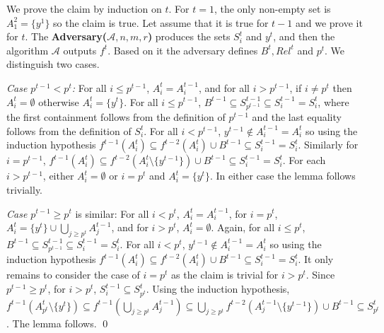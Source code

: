 \documentclass[runningheads,a4paper]{llncs}
\newcommand{\A}{\mathcal{A}}
\newenvironment{proofof}[1]{\noindent{\it Proof of #1. }} {{\qed}}
\begin{document}
\bigskip
\begin{proofof}{Lemma \ref{l-p2}}
We prove the claim by induction on $t$. For $t=1$, the only non-empty set is $A^2_1=\{y^1\}$ so the claim is true. 
Let assume that it is true for $t-1$ and we prove it for $t$. 
The {\bf Adversary($\A,n,m,r$)} produces the sets $S^t_i$ and $y^t$, and then the algorithm $\A$ outputs $f^t$.
Based on it the adversary defines $B^t, Rel^t$ and $p^t$.
We distinguish two cases.

\emph{Case $p^{t-1} < p^t$:} For all $i\le p^{t-1}$, $A^{t}_i = A^{t-1}_i$, and for all $i> p^{t-1}$, if $i\not=p^t$ then $A^t_i=\emptyset$
otherwise $A^t_i = \{y^t\}$. For all $i\le p^{t-1}$, $B^{t-1} \subseteq S^{t-1}_{p^{t-1}} \subseteq S^{t-1}_i = S^t_i$, where
the first containment follows from the definition of $p^{t-1}$ and the last equality follows from the definition of $S^t_i$.
For all $i<p^{t-1}$, $y^{t-1} \not\in A^{t-1}_i = A^t_i$ so using the induction hypothesis 
$f^{t-1}(A^t_i) \subseteq f^{t-2}(A^t_i) \cup B^{t-1} \subseteq S^{t-1}_i = S^t_i$.
Similarly for $i=p^{t-1}$, $f^{t-1}(A^t_i) \subseteq f^{t-2}(A^t_i \setminus \{y^{t-1}\}) \cup B^{t-1} \subseteq S^{t-1}_i = S^t_i$.
For each $i>p^{t-1}$, either $A^t_i = \emptyset$ or $i=p^t$ and $A^t_i=\{y^t\}$. In either case the lemma follows trivially.

\emph{Case $p^{t-1} \ge p^t$} is similar: For all $i < p^{t}$, $A^{t}_i = A^{t-1}_i$, for $i=p^t$, $A^t_i = \{y^t\} \cup \bigcup_{j\ge p^t} A^{t-1}_j$,
and for $i>p^t$, $A^t_i=\emptyset$. Again, for all $i\le p^{t}$, $B^{t-1} \subseteq S^{t-1}_{p^{t-1}} \subseteq S^{t-1}_i = S^t_i$.
For all $i<p^{t}$, $y^{t-1} \not\in A^{t-1}_i = A^t_i$ so using the induction hypothesis 
$f^{t-1}(A^t_i) \subseteq f^{t-2}(A^t_i) \cup B^{t-1} \subseteq S^{t-1}_i = S^t_i$.
It only remains to consider the case of $i=p^t$ as the claim is trivial for $i>p^t$.
Since $p^{t-1} \ge p^t$, for $i>p^t$, $S^{t-1}_i \subseteq S^t_{p^t}$.
Using the induction hypothesis, $f^{t-1}(A^t_{p^t} \setminus \{y^t\}) \subseteq f^{t-1}(\bigcup_{j\ge p^t} A^{t-1}_j)
\subseteq \bigcup_{j\ge p^t} f^{t-2}( A^{t-1}_j \setminus \{y^{t-1}\}) \cup B^{t-1} \subseteq S^t_{p^t}$. The lemma follows.
\end{proofof}
\end{document}
